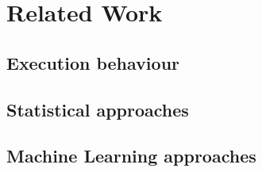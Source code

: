 \chapter{Related Work}
\label{chap:related-work}

\section{Execution behaviour}

\section{Statistical approaches}

\section{Machine Learning approaches}